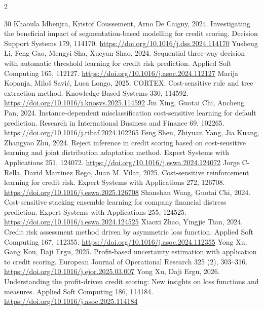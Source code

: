 \documentclass[12pt]{article}
\begin{document}
\begin{singlespace}
{\scriptsize\setlength{\baselineskip}{7.6pt}\sloppy\setlength{\itemsep}{0pt}\setlength{\parsep}{0pt}\setlength{\topsep}{0pt}
\setlength{\columnsep}{0.7em}
\begin{multicols}{2}
\begin{thebibliography}{30}
 Khaoula Idbenjra, Kristof Coussement, Arno De Caigny, 2024. Investigating the beneficial impact of segmentation-based modelling for credit scoring. Decision Support Systems 179, 114170. \url{https://doi.org/10.1016/j.dss.2024.114170}
 Yusheng Li, Feng Gao, Mengyi Sha, Xueyan Shao, 2024. Sequential three-way decision with automatic threshold learning for credit risk prediction. Applied Soft Computing 165, 112127. \url{https://doi.org/10.1016/j.asoc.2024.112127}
 Marija Kopanja, Milo\v{s} Savi\'{c}, Luca Longo, 2025. CORTEX: Cost-sensitive rule and tree extraction method. Knowledge-Based Systems 330, 114592. \url{https://doi.org/10.1016/j.knosys.2025.114592}
 Jin Xing, Guotai Chi, Ancheng Pan, 2024. Instance-dependent misclassification cost-sensitive learning for default prediction. Research in International Business and Finance 69, 102265. \url{https://doi.org/10.1016/j.ribaf.2024.102265}
 Feng Shen, Zhiyuan Yang, Jia Kuang, Zhangyao Zhu, 2024. Reject inference in credit scoring based on cost-sensitive learning and joint distribution adaptation method. Expert Systems with Applications 251, 124072. \url{https://doi.org/10.1016/j.eswa.2024.124072}
 Jorge C-Rella, David Martinez Rego, Juan M. Vilar, 2025. Cost-sensitive reinforcement learning for credit risk. Expert Systems with Applications 272, 126708. \url{https://doi.org/10.1016/j.eswa.2025.126708}
 Shanshan Wang, Guotai Chi, 2024. Cost-sensitive stacking ensemble learning for company financial distress prediction. Expert Systems with Applications 255, 124525. \url{https://doi.org/10.1016/j.eswa.2024.124525}
 Xiaoxi Zhao, Yingjie Tian, 2024. Credit risk assessment method driven by asymmetric loss function. Applied Soft Computing 167, 112355. \url{https://doi.org/10.1016/j.asoc.2024.112355}
 Yong Xu, Gang Kou, Daji Ergu, 2025. Profit-based uncertainty estimation with application to credit scoring. European Journal of Operational Research 325 (2), 303--316. \url{https://doi.org/10.1016/j.ejor.2025.03.007}
 Yong Xu, Daji Ergu, 2026. Understanding the profit-driven credit scoring: New insights on loss functions and measures. Applied Soft Computing 186, 114184. \url{https://doi.org/10.1016/j.asoc.2025.114184}

\end{thebibliography}
\end{multicols}}
\end{singlespace}
\end{document}

